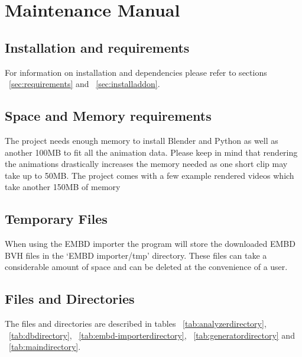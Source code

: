 \chapter{Maintenance Manual \label{chap:maintenance}}

\section{Installation and requirements}
For information on installation and dependencies please refer to sections ~\ref{sec:requirements} and ~\ref{sec:installaddon}.

\section{Space and Memory requirements}
The project needs enough memory to install Blender and Python as well as another 100MB to fit all the animation data. Please keep in mind that rendering the animations drastically increases the memory needed as one short clip may take up to 50MB. The project comes with a few example rendered videos which take another 150MB of memory

\section{Temporary Files}
When using the EMBD importer the program will store the downloaded EMBD BVH files in the `EMBD importer/tmp' directory. These files can take a considerable amount of space and can be deleted at the convenience of a user.

\section{Files and Directories}
The files and directories are described in tables ~\ref{tab:analyzerdirectory}, ~\ref{tab:dbdirectory}, ~\ref{tab:embd-importerdirectory}, ~\ref{tab:generatordirectory} and ~\ref{tab:maindirectory}.

